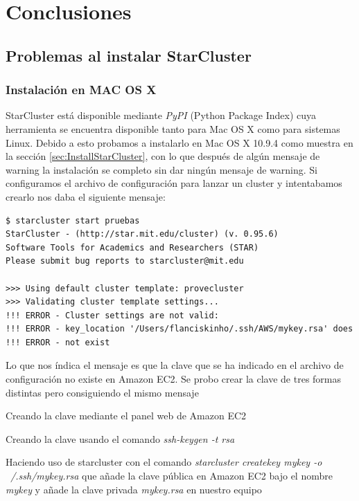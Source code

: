 \documentclass{article}
\begin{document}
\clearpage
\section{Conclusiones}



\subsection{Problemas al instalar StarCluster}

\subsubsection{Instalación en MAC OS X}
	StarCluster está disponible mediante \emph{PyPI} (Python Package Index) cuya herramienta se encuentra disponible tanto para Mac OS X como para sistemas Linux. Debido a esto probamos a instalarlo en Mac OS X 10.9.4 como muestra en la sección \ref{sec:InstallStarCluster}, con lo que después de algún mensaje de warning la instalación se completo sin dar ningún mensaje de warning. Si configuramos el archivo de configuración para lanzar un cluster y intentabamos crearlo nos daba el siguiente mensaje:
\begin{lstlisting}[style=miniBash]
$ starcluster start pruebas
StarCluster - (http://star.mit.edu/cluster) (v. 0.95.6)
Software Tools for Academics and Researchers (STAR)
Please submit bug reports to starcluster@mit.edu

>>> Using default cluster template: provecluster
>>> Validating cluster template settings...
!!! ERROR - Cluster settings are not valid:
!!! ERROR - key_location '/Users/flanciskinho/.ssh/AWS/mykey.rsa' does
!!! ERROR - not exist
\end{lstlisting}
Lo que nos índica el mensaje es que la clave que se ha indicado en el archivo de configuración no existe en Amazon EC2. Se probo crear la clave de tres formas distintas pero consiguiendo el mismo mensaje
{\setlength{\parskip}{0mm}\begin{enumerate}
{\setlength{\parskip}{0mm}
	\item Creando la clave mediante el panel web de Amazon EC2
	\item Creando la clave usando el comando \emph{ssh-keygen -t rsa}
	\item Haciendo uso de starcluster con el comando \emph{starcluster createkey mykey -o ~/.ssh/mykey.rsa} que añade la clave pública en Amazon EC2 bajo el nombre \emph{mykey} y añade la clave privada \emph{mykey.rsa} en nuestro equipo
}
\end{enumerate}}
\end{document}
